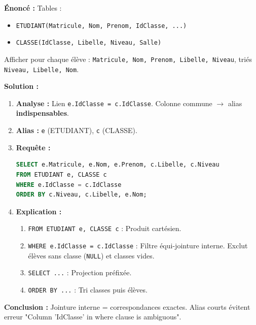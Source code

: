 \documentclass[11pt]{article}
\begin{document}
\begin{exoresolu}
\textbf{Énoncé :} Tables :
\begin{itemize}
    \item \texttt{ETUDIANT(Matricule, Nom, Prenom, IdClasse, ...)}
    \item \texttt{CLASSE(IdClasse, Libelle, Niveau, Salle)}
\end{itemize}
Afficher pour chaque élève : \texttt{Matricule, Nom, Prenom, Libelle, Niveau}, triés \texttt{Niveau, Libelle, Nom}.

\tcblower
\textbf{Solution :}
\begin{enumerate}
    \item \textbf{Analyse :} Lien \texttt{e.IdClasse = c.IdClasse}. Colonne commune $\rightarrow$ alias \textbf{indispensables}.
    \item \textbf{Alias :} \texttt{e} (ETUDIANT), \texttt{c} (CLASSE).
    \item \textbf{Requête :}
\begin{lstlisting}[language=SQL]
SELECT e.Matricule, e.Nom, e.Prenom, c.Libelle, c.Niveau
FROM ETUDIANT e, CLASSE c
WHERE e.IdClasse = c.IdClasse
ORDER BY c.Niveau, c.Libelle, e.Nom;
\end{lstlisting}
    \item \textbf{Explication :}
    \begin{enumerate}
        \item \texttt{FROM ETUDIANT e, CLASSE c} : Produit cartésien.
        \item \texttt{WHERE e.IdClasse = c.IdClasse} : Filtre équi-jointure interne. Exclut élèves sans classe (\texttt{NULL}) et classes vides.
        \item \texttt{SELECT ...} : Projection préfixée.
        \item \texttt{ORDER BY ...} : Tri classes puis élèves.
    \end{enumerate}
\end{enumerate}
\textbf{Conclusion :} Jointure interne = correspondances exactes. Alias courts évitent erreur "Column 'IdClasse' in where clause is ambiguous".
\end{exoresolu}
\end{document}
